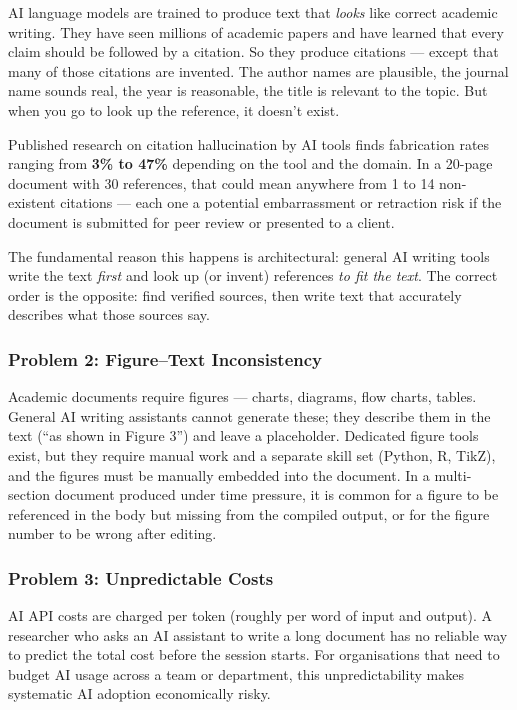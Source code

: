 AI language models are trained to produce text that \emph{looks} like correct
academic writing.
They have seen millions of academic papers and have learned that every claim
should be followed by a citation.
So they produce citations — except that many of those citations are invented.
The author names are plausible, the journal name sounds real, the year is
reasonable, the title is relevant to the topic.
But when you go to look up the reference, it doesn't exist.

\begin{warnbox}[title=How Common Is This?]
Published research on citation hallucination by AI tools finds fabrication rates
ranging from \textbf{3\% to 47\%} depending on the tool and the domain.
In a 20-page document with 30 references, that could mean anywhere from 1 to
14 non-existent citations — each one a potential embarrassment or retraction risk
if the document is submitted for peer review or presented to a client.
\end{warnbox}

The fundamental reason this happens is architectural: general AI writing tools
write the text \emph{first} and look up (or invent) references \emph{to fit the text}.
The correct order is the opposite: find verified sources, then write text that
accurately describes what those sources say.

\subsubsection*{Problem 2: Figure–Text Inconsistency}

Academic documents require figures — charts, diagrams, flow charts, tables.
General AI writing assistants cannot generate these; they describe them in the text
(``as shown in Figure 3'') and leave a placeholder.
Dedicated figure tools exist, but they require manual work and a separate skill set
(Python, R, TikZ), and the figures must be manually embedded into the document.
In a multi-section document produced under time pressure, it is common for a figure
to be referenced in the body but missing from the compiled output, or for the figure
number to be wrong after editing.

\subsubsection*{Problem 3: Unpredictable Costs}

AI API costs are charged per token (roughly per word of input and output).
A researcher who asks an AI assistant to write a long document has no reliable way
to predict the total cost before the session starts.
For organisations that need to budget AI usage across a team or department,
this unpredictability makes systematic AI adoption economically risky.

